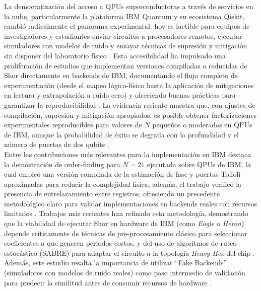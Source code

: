 \documentclass[12pt, spanish]{book}
\begin{document}
La democratización del acceso a QPUs superconductoras a través de servicios en la nube, particularmente la plataforma IBM Quantum y su ecosistema Qiskit, cambió radicalmente el panorama experimental: hoy es factible para equipos de investigadores y estudiantes enviar circuitos a procesadores remotos, ejecutar simuladores con modelos de ruido y ensayar técnicas de supresión y mitigación sin disponer del laboratorio físico \cite{Saxena2021,IBMqiskit}. Esta accesibilidad ha impulsado una proliferación de estudios que implementan versiones compiladas o reducidas de Shor directamente en backends de IBM, documentando el flujo completo de experimentación (desde el mapeo lógico-físico hasta la aplicación de mitigaciones en lectura y extrapolación a ruido cero) y ofreciendo buenas prácticas para garantizar la reproducibilidad \cite{Saxena2021,DeCusatis2021,IBM}. La evidencia reciente muestra que, con ajustes de compilación, supresión y mitigación apropiados, es posible obtener factorizaciones experimentales reproducibles para valores de $N$ pequeños o moderados en QPUs de IBM, aunque la probabilidad de éxito se degrada con la profundidad y el número de puertas de dos qubits \cite{Skosana2021,Rossi2022,Roffe2019}.\\

Entre las contribuciones más relevantes para la implementación en IBM destaca la demostración de order-finding para $N=21$ ejecutada sobre QPUs de IBM, la cual empleó una versión compilada de la estimación de fase y puertas Toffoli aproximadas para reducir la complejidad física, además, el trabajo verificó la presencia de entrelazamiento entre registros, ofreciendo un precedente metodológico claro para validar implementaciones en backends reales con recursos limitados \cite{Skosana2021}. Trabajos más recientes han refinado esta metodología, demostrando que la viabilidad de ejecutar Shor en hardware de IBM (como \textit{Eagle} o \textit{Heron}) depende críticamente de técnicas de pre-procesamiento clásico para seleccionar coeficientes $a$ que generen periodos cortos, y del uso de algoritmos de ruteo estocástico (SABRE) para adaptar el circuito a la topología \textit{Heavy-Hex} del chip \cite{villarreal}. Además, este estudio resalta la importancia de utilizar ``Fake Backends'' (simuladores con modelos de ruido reales) como paso intermedio de validación para predecir la similitud antes de consumir recursos de hardware \cite{villarreal, DeCusatis2021}.\\
\end{document}
